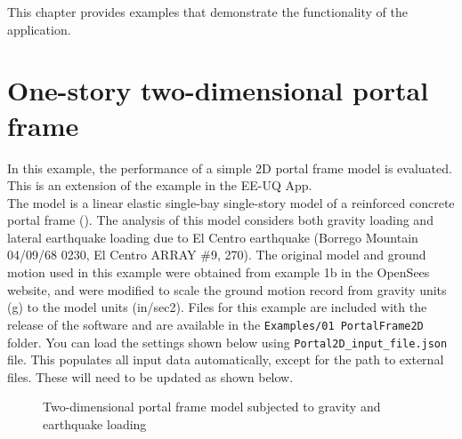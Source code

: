 This chapter provides examples that demonstrate the functionality of the \texttt{\getsoftwarename{}} application.

\section{One-story two-dimensional portal frame}

In this example, the performance of a simple 2D portal frame model is evaluated. This is an extension of the example in the EE-UQ App.\\

The model is a linear elastic single-bay single-story model of a reinforced concrete portal frame (). The analysis of this model considers both gravity loading and lateral earthquake loading due to El Centro earthquake (Borrego Mountain 04/09/68 0230, El Centro ARRAY \#9, 270). The original model and ground motion used in this example were obtained from example 1b in the OpenSees website, and were modified to scale the ground motion record from gravity units (g) to the model units (in/sec2). Files for this example are included with the release of the software and are available in the \texttt{Examples/01 PortalFrame2D} folder. You can load the settings shown below using \texttt{Portal2D\_input\_file.json} file. This populates all input data automatically, except for the path to external files. These will need to be updated as shown below.\\

\begin{figure}[!htbp]
  \caption{Two-dimensional portal frame model subjected to gravity and earthquake loading}
  \label{fig:ex_1_portal_frame}
\end{figure}

